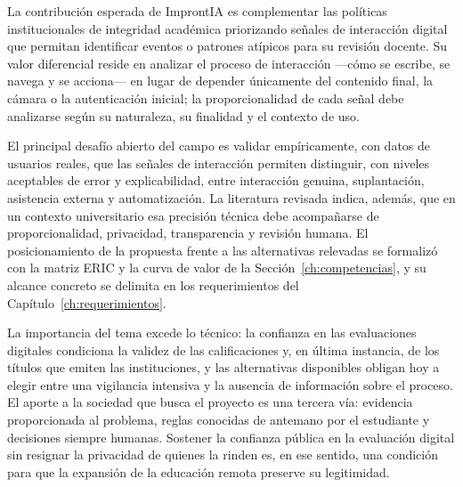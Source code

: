 La contribución esperada de ImprontIA es complementar las políticas institucionales de integridad académica priorizando señales de interacción digital que permitan identificar eventos o patrones atípicos para su revisión docente. Su valor diferencial reside en analizar el proceso de interacción ---cómo se escribe, se navega y se acciona--- en lugar de depender únicamente del contenido final, la cámara o la autenticación inicial; la proporcionalidad de cada señal debe analizarse según su naturaleza, su finalidad y el contexto de uso.

El principal desafío abierto del campo es validar empíricamente, con datos de usuarios reales, que las señales de interacción permiten distinguir, con niveles aceptables de error y explicabilidad, entre interacción genuina, suplantación, asistencia externa y automatización. La literatura revisada indica, además, que en un contexto universitario esa precisión técnica debe acompañarse de proporcionalidad, privacidad, transparencia y revisión humana. El posicionamiento de la propuesta frente a las alternativas relevadas se formalizó con la matriz ERIC y la curva de valor de la Sección~\ref{ch:competencias}, y su alcance concreto se delimita en los requerimientos del Capítulo~\ref{ch:requerimientos}.

La importancia del tema excede lo técnico: la confianza en las evaluaciones digitales condiciona la validez de las calificaciones y, en última instancia, de los títulos que emiten las instituciones, y las alternativas disponibles obligan hoy a elegir entre una vigilancia intensiva y la ausencia de información sobre el proceso. El aporte a la sociedad que busca el proyecto es una tercera vía: evidencia proporcionada al problema, reglas conocidas de antemano por el estudiante y decisiones siempre humanas. Sostener la confianza pública en la evaluación digital sin resignar la privacidad de quienes la rinden es, en ese sentido, una condición para que la expansión de la educación remota preserve su legitimidad.
